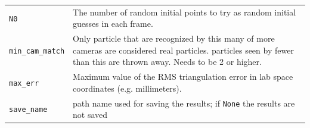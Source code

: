 \documentclass[10pt,a4paper]{article}
\begin{document}
\begin{table}[!ht]
\begin{tabular}{l m{10cm}}
		\texttt{N0} &  The number of random initial points to try as random initial guesses in each frame.\\
		
		\texttt{min\_cam\_match} & Only particle that are recognized by this many of more cameras are considered real particles. particles seen by fewer than this are thrown away. Needs to be 2 or higher. \\
		
		
		
		\texttt{max\_err} & Maximum value of the RMS triangulation error in lab space coordinates (e.g. millimeters). \\
		
		\texttt{save\_name} & path name used for saving the results; if \texttt{None} the results are not saved \\
		
		\hline
	\end{tabular}
\end{table}
\end{document}
